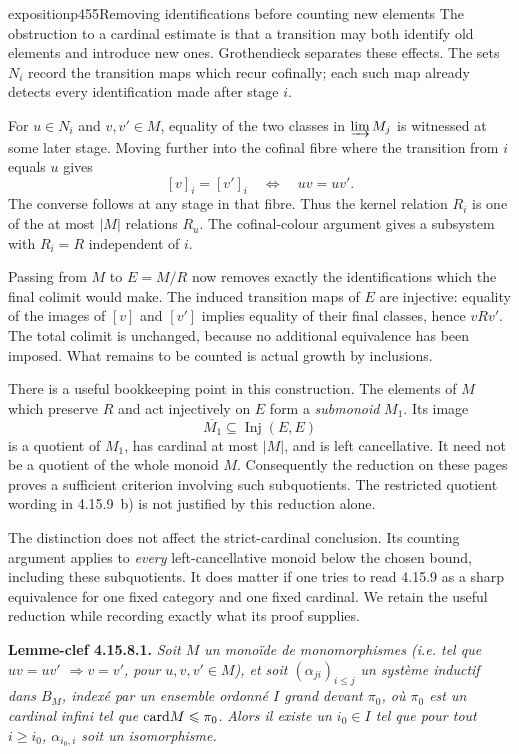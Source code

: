 \begin{dcomment}{exposition}{p455}{Removing identifications before counting new elements}
The obstruction to a cardinal estimate is that a transition may both identify old elements and introduce new ones. Grothendieck separates these effects. The sets $N_i$ record the transition maps which recur cofinally; each such map already detects every identification made after stage $i$.

For $u\in N_i$ and $v,v'\in M$, equality of the two classes in $\varinjlim M_j$ is witnessed at some later stage. Moving further into the cofinal fibre where the transition from $i$ equals $u$ gives
\[
[v]_i=[v']_i\quad\Longleftrightarrow\quad uv=uv'.
\]
The converse follows at any stage in that fibre. Thus the kernel relation $R_i$ is one of the at most $|M|$ relations $R_u$. The cofinal-colour argument gives a subsystem with $R_i=R$ independent of $i$.

Passing from $M$ to $E=M/R$ now removes exactly the identifications which the final colimit would make. The induced transition maps of $E$ are injective: equality of the images of $[v]$ and $[v']$ implies equality of their final classes, hence $vRv'$. The total colimit is unchanged, because no additional equivalence has been imposed. What remains to be counted is actual growth by inclusions.

There is a useful bookkeeping point in this construction. The elements of $M$ which preserve $R$ and act injectively on $E$ form a \emph{submonoid} $M_1$. Its image
\[
\overline{M_1}\subseteq\operatorname{Inj}(E,E)
\]
is a quotient of $M_1$, has cardinal at most $|M|$, and is left cancellative. It need not be a quotient of the whole monoid $M$. Consequently the reduction on these pages proves a sufficient criterion involving such subquotients. The restricted quotient wording in 4.15.9~b) is not justified by this reduction alone.

The distinction does not affect the strict-cardinal conclusion. Its counting argument applies to \emph{every} left-cancellative monoid below the chosen bound, including these subquotients. It does matter if one tries to read 4.15.9 as a sharp equivalence for one fixed category and one fixed cardinal. We retain the useful reduction while recording exactly what its proof supplies.
\end{dcomment}


\textbf{Lemme-clef 4.15.8.1.} \textit{Soit $M$ un monoïde de monomorphismes (i.e. tel que $uv = uv'$ $\Longrightarrow v = v'$, pour $u,v,v' \in M$), et soit $(\alpha_{ji})_{i\leqslant j}$ un système inductif dans $B_M$, indexé par un ensemble ordonné $I$ grand devant $\pi_0$, où $\pi_0$ est un cardinal}
\textit{infini tel que} $\mathrm{card} M \leqslant \pi_0$. \textit{Alors il existe un $i_0 \in I$ tel que pour tout $i \geqslant i_0$, $\alpha_{i_0,i}$ soit un isomorphisme.}


